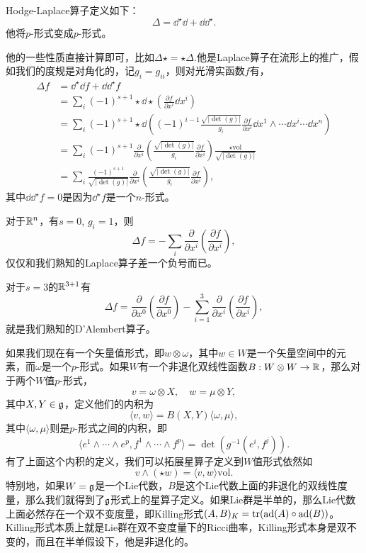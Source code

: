 \begin{defi}
Hodge-Laplace算子定义如下：
\[
	\Delta=\dd^\star\dd+\dd\dd^\star.
\]
他将$p$-形式变成$p$-形式。
\end{defi}
他的一些性质直接计算即可，比如$\Delta\star=\star\Delta$.他是Laplace算子在流形上的推广，假如我们的度规是对角化的，记$g_i=g_{i i}$，则对光滑实函数$f$有，
\begin{align*}
	\Delta f&=\dd^\star\dd f+\dd\dd^\star f\\
	&=\sum_i(-1)^{s+1}\star\dd\star\left(\frac{\partial f}{\partial x^i}\dd x^i\right)\\
	&=\sum_i(-1)^{s+1}\star\dd\left((-1)^{i-1}\frac{\sqrt{|\det(g)|}}{g_i} \frac{\partial f}{\partial x^i}\dd x^1\wedge\cdots\hat{\dd x^i}\cdots\dd x^n\right)\\
	&=\sum_i(-1)^{s+1}\frac{\partial}{\partial x^i}\left(\frac{\sqrt{|\det(g)|}}{g_i} \frac{\partial f}{\partial x^i}\right)\frac{\star\mathrm{vol}}{\sqrt{|\det(g)|}}\\
	&=\sum_i\frac{(-1)^{s+1}}{\sqrt{|\det(g)|}}\frac{\partial}{\partial x^i}\left(\frac{\sqrt{|\det(g)|}}{g_i} \frac{\partial f}{\partial x^i}\right),
\end{align*}
其中$\dd\dd^\star f=0$是因为$\dd^\star f$是一个$n$-形式。

对于$\mathbb{R}^n$，有$s=0$, $g_i=1$，则
\[
	\Delta f=-\sum_i\frac{\partial}{\partial x^i}\left(\frac{\partial f}{\partial x^i}\right),
\]
仅仅和我们熟知的Laplace算子差一个负号而已。

对于$s=3$的$\mathbb{R}^{3+1}$有
\[
	\Delta f=\frac{\partial}{\partial x^0}\left(\frac{\partial f}{\partial x^0}\right)-\sum_{i=1}^3\frac{\partial}{\partial x^i}\left(\frac{\partial f}{\partial x^i}\right),
\]
就是我们熟知的D'Alembert算子。

如果我们现在有一个矢量值形式，即$w\otimes \omega$，其中$w\in W$是一个矢量空间中的元素，而$\omega$是一个$p$-形式。如果$W$有一个非退化双线性函数$B:W\otimes W\to \mathbb{R}$，那么对于两个$W$值$p$-形式，
\[
	v=\omega\otimes X,\quad w=\mu\otimes Y,
\]
其中$X,Y\in {\mathfrak{g}}$，定义他们的内积为
\[
	\langle v,w\rangle=B(X,Y) \langle\omega,\mu\rangle,
\]
其中$\langle\omega,\mu\rangle$则是$p$-形式之间的内积，即
\[
	\langle e^1\wedge\cdots \wedge e^p,f^1\wedge\cdots \wedge f^p\rangle =\det(g^{-1}(e^i,f^j)).
\]
有了上面这个内积的定义，我们可以拓展星算子定义到$W$值形式依然如
\[
	v\wedge(\star w)=\langle v,w\rangle \mathrm{vol}.
\]
特别地，如果$W={\mathfrak{g}}$是一个Lie代数，$B$是这个Lie代数上面的非退化的双线性度量，那么我们就得到了${\mathfrak{g}}$形式上的星算子定义。如果Lie群是半单的，那么Lie代数上面必然存在一个双不变度量，即Killing形式$(A,B)_K=\operatorname{tr}(\mathrm{ad}(A)\circ \mathrm{ad}(B))$。Killing形式本质上就是Lie群在双不变度量下的Ricci曲率，Killing形式本身是双不变的，而且在半单假设下，他是非退化的。


